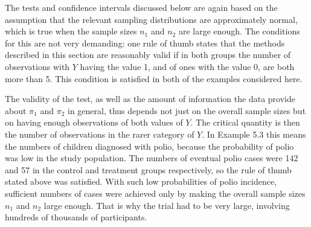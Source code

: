 \label{p2pthumb}
The tests and confidence intervals discussed below are again based on
the assumption that the relevant sampling distributions are
approximately normal, which is true when the sample sizes $n_{1}$ and
$n_{2}$ are large enough. The conditions for this are not very
demanding: one rule of thumb states that the methods described in this
section are reasonably valid if in both groups the number of
observations with $Y$ having the value 1, and of ones with the value 0,
are both more than 5. This condition is satisfied in both of the
examples considered here.

The validity of the test, as well as the amount of information the data
provide about $\pi_{1}$ and $\pi_{2}$ in general, thus depends not just
on the overall sample sizes but on having enough observations of both
values of $Y$. The critical quantity is then the number of observations
in the rarer category of $Y$. In Example 5.3 this means the numbers of
children diagnosed with polio, because the probability of polio was
 low in the study population. The numbers of eventual polio
cases were 142 and 57 in the control and treatment groups respectively,
so the rule of thumb stated above was satisfied. With such low
probabilities of polio incidence, sufficient numbers of cases were
achieved only by making the overall sample sizes $n_{1}$ and $n_{2}$
large enough. That is why the trial had to be very large, involving
hundreds of thousands of participants.


